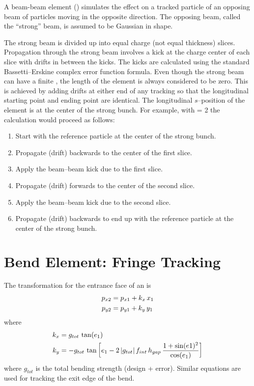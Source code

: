 A beam-beam element () simulates the effect on a tracked
particle of an opposing beam of particles moving in the opposite
direction. The opposing beam, called the ``strong'' beam, is assumed
to be Gaussian in shape.

The strong beam is divided up into  equal charge (not
equal thickness) slices. Propagation through the strong beam involves
a kick at the charge center of each slice with drifts in between the
kicks. The kicks are calculated using the standard Bassetti--Erskine
complex error function formula\cite{b:talman}.  Even though the strong
beam can have a finite , the length of the element is always
considered to be zero. This is achieved by adding drifts at either end
of any tracking so that the longitudinal starting point and ending
point are identical. The longitudinal $s$--position of the
 element is at the center of the strong bunch. For
example, with  = 2 the calculation would proceed as
follows:
\begin{enumerate}
  \item  Start with the reference particle at the center of the strong bunch.
  \item  Propagate (drift) backwards to the center of the first slice.
  \item  Apply the beam--beam kick due to the first slice.
  \item  Propagate (drift) forwards to the center of the second slice.
  \item  Apply the beam--beam kick due to the second slice.
  \item  Propagate (drift) backwards to end up with the reference particle
     at the center of the strong bunch.
\end{enumerate}

\section{Bend Element: Fringe Tracking}
\label{s:.bend.fringe.std}

The transformation for the entrance face of an  is
\begin{align}
  p_{x2} &= p_{x1} + k_x \, x_1 \nonumber \\
  p_{y2} &= p_{y1} + k_y \, y_1
\end{align}
where
\begin{align}
  k_x &= g_{tot} \, \tan(e_1) \nonumber \\
  k_y &= -g_{tot} \, \tan \left[ e_1 - 2 \, |g_{tot}| \, f_{int} \,  h_{gap} \, 
    \frac{1 + \sin(e1)^2}{\cos(e_1)} \right]
\end{align}
where $g_{tot}$ is the total bending strength (design +
error). Similar equations are used for tracking the exit edge of the
bend.


